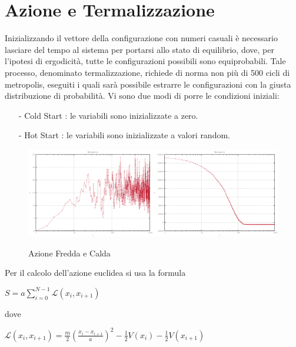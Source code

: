 \section{Azione e Termalizzazione}

Inizializzando il vettore della configurazione con numeri casuali è necessario lasciare del tempo al sistema per portarsi allo stato di equilibrio, dove, per l'ipotesi di ergodicità, tutte le configurazioni possibili sono equiprobabili. Tale processo, denominato termalizzazione, richiede di norma non più di 500 cicli di metropolis, eseguiti i quali sarà possibile estrarre le configurazioni con la giusta distribuzione di probabilità. Vi sono due modi di porre le condizioni iniziali:
\begin{itemize}
   \item[-] Cold Start : le variabili sono inizializzate a zero.
   \item[-] Hot Start : le variabili sono inizializzate a valori random.
\end{itemize}
\begin{figure}[H]
\centering
\includegraphics[width=0.5\textwidth]{action1}\includegraphics[width=0.5\textwidth]{action2}
\caption{Azione Fredda e Calda}
\label{fig:action}
\end{figure}
Per il calcolo dell'azione euclidea si usa la formula
\begin{center}$S = a\displaystyle\sum\limits_{i=0}^{N-1} \mathcal{L}(x_{i},x_{i+1})$\end{center}
dove
\begin{center}$\mathcal{L}(x_{i},x_{i+1}) = \frac{m}{2}\left(\frac{x_{i}-x_{i+1}}{a}\right)^{2}-\frac{1}{2}V(x_{i})-\frac{1}{2}V(x_{i+1})$\end{center}
